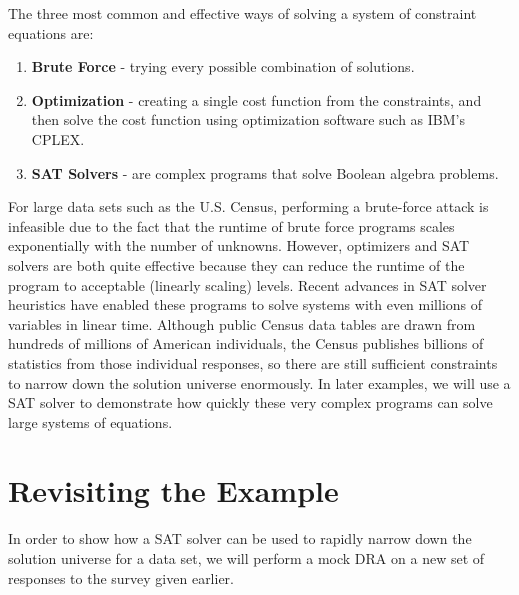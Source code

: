 \documentclass[jou,apacite]{apa6}
\begin{document}
The three most common and effective ways of solving a
system of constraint equations are:
\begin{enumerate}

\item \textbf{Brute Force} - trying every possible combination of solutions.\\
\item \textbf{Optimization} - creating a single cost function from the constraints, and then solve the cost function using optimization software such as IBM's CPLEX. \\
\item \textbf{SAT Solvers} - are complex programs that solve Boolean algebra problems.

\end{enumerate}

For large data sets such as the U.S. Census, performing a brute-force attack is infeasible due to the fact that the runtime of brute force programs scales exponentially with the number of unknowns. However, optimizers and SAT solvers are both quite effective because they can reduce the runtime of the program to acceptable (linearly scaling) levels. Recent advances in SAT solver heuristics have enabled these programs to solve systems with even millions of variables in linear time. Although public Census data tables are drawn from hundreds of millions of American individuals, the Census publishes billions of statistics from those individual responses, so there are still sufficient constraints to narrow down the solution universe enormously. In later examples, we will use a SAT solver to demonstrate how quickly these very complex programs can solve large systems of equations.

\section{Revisiting the Example}

In order to show how a SAT solver can be used to rapidly narrow down the solution universe for a data set, we will perform a mock DRA on a new set of responses to the survey given earlier.
\end{document}
